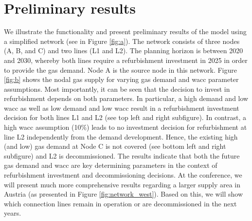 \documentclass[review]{elsarticle}
\begin{document}
\section{Preliminary results}
We illustrate the functionality and present preliminary results of the model using a simplified network (see in Figure \ref{fig:a}). The network consists of three nodes (A, B, and C) and two lines (L1 and L2). The planning horizon is between 2020 and 2030, whereby both lines require a refurbishment investment in 2025 in order to provide the gas demand. Node A is the source node in this network. Figure \ref{fig:b} shows the nodal gas supply for varying gas demand and wacc parameter assumptions. Most importantly, it can be seen that the decision to invest in refurbishment depends on both parameters. In particular, a high demand and low wacc as well as low demand and low wacc result in a refurbishment investment decision for both lines L1 and L2 (see top left and right subfigure). In contrast, a high wacc assumption (10\%) leads to no investment decision for refurbishment at line L2 independently from the demand development. Hence, the existing high (and low) gas demand at Node C is not covered (see bottom left and right subfigure) and L2 is decommissioned. The results indicate that both the future gas demand and wacc are key determining parameters in the context of refurbishment investment and decommissioning decisions. At the conference, we will present much more comprehensive results regarding a larger supply area in Austria (as presented in Figure \ref{fig:network_west}). Based on this, we will show which connection lines remain in operation or are decommissioned in the next years.   
\end{document}
